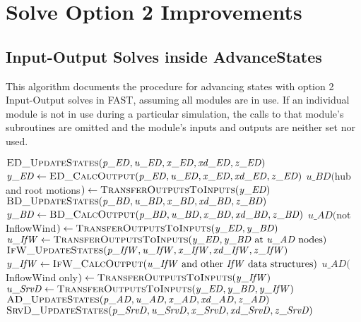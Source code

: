 \documentclass[10pt,letterpaper,oneside,notitlepage]{article}
\begin{document}
\pagebreak %
\section{Solve Option 2 Improvements}
\subsection {Input-Output Solves inside AdvanceStates}
This algorithm documents the procedure for advancing states with option 2 
Input-Output solves in FAST, assuming
all modules are in use. If an individual module is not in use during a particular
simulation, the calls to that module's subroutines are omitted and the module's 
inputs and outputs are neither set nor used.

\begin{algorithmic}[1]
\State $\Call{ED\_UpdateStates}{\mathit{p\_ED},\mathit{u\_ED},\mathit{x\_ED},\mathit{xd\_ED},\mathit{z\_ED}}$
\State $\mathit{y\_ED} \gets \Call{ED\_CalcOutput}{\mathit{p\_ED},\mathit{u\_ED},\mathit{x\_ED},\mathit{xd\_ED},\mathit{z\_ED}}$
\State
\State $\mathit{u\_BD}($hub and root motions$) \gets \Call{TransferOutputsToInputs}{\mathit{y\_ED}}$
\State $\Call{BD\_UpdateStates}{\mathit{p\_BD},\mathit{u\_BD},\mathit{x\_BD},\mathit{xd\_BD},\mathit{z\_BD}}$
\State $\mathit{y\_BD} \gets \Call{BD\_CalcOutput}{\mathit{p\_BD},\mathit{u\_BD},\mathit{x\_BD},\mathit{xd\_BD},\mathit{z\_BD}}$
\State
\State $\mathit{u\_AD}($not InflowWind$) \gets \Call{TransferOutputsToInputs}{\mathit{y\_ED},\mathit{y\_BD}}$
\State $\mathit{u\_IfW} \gets \Call{TransferOutputsToInputs}{\mathit{y\_ED},\mathit{y\_BD}$ at $\mathit{u\_AD}$ nodes$}$
\State $\Call{IfW\_UpdateStates}{\mathit{p\_IfW},\mathit{u\_IfW},\mathit{x\_IfW},\mathit{xd\_IfW},\mathit{z\_IfW}}$
\State $\mathit{y\_IfW} \gets \Call{IfW\_CalcOutput}{\mathit{u\_IfW}$ and other $\mathit{IfW}$ data structures$}$
\State
\State $\mathit{u\_AD}($InflowWind only$) \gets \Call{TransferOutputsToInputs}{\mathit{y\_IfW}}$
\State $\mathit{u\_SrvD} \gets \Call{TransferOutputsToInputs}{\mathit{y\_ED},\mathit{y\_BD},\mathit{y\_IfW}}$
\State $\Call{AD\_UpdateStates}{\mathit{p\_AD},\mathit{u\_AD},\mathit{x\_AD},\mathit{xd\_AD},\mathit{z\_AD}}$
\State $\Call{SrvD\_UpdateStates}{\mathit{p\_SrvD},\mathit{u\_SrvD},\mathit{x\_SrvD},\mathit{xd\_SrvD},\mathit{z\_SrvD}}$
\State


\end{algorithmic}
\end{document}

